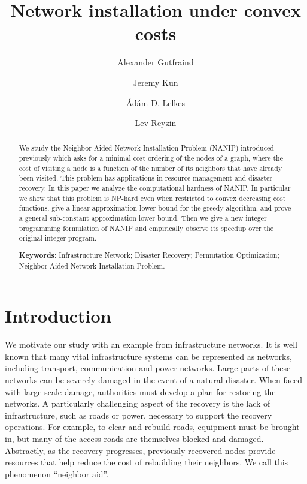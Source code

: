 \documentclass[english]{llncs}
\newcommand{\chg}[1]{\textbf{\color{red} #1}}
\begin{document}
\title{\chg{Network installation under convex costs}}
\date{}

\author{Alexander Gutfraind \and
Jeremy Kun \and
\'Ad\'am D. Lelkes \and
Lev Reyzin}  


\maketitle
 
 
\begin{abstract}
We study the Neighbor Aided Network Installation Problem (NANIP) introduced
previously which asks for a minimal cost ordering of the nodes of
a graph, where the cost of visiting a node is a function of the number of
its neighbors that have already been visited. This problem has applications in
resource management and disaster recovery. In this paper we analyze the
computational hardness of NANIP. In particular we show that this problem is
NP-hard even when restricted to convex decreasing cost functions, give a
linear approximation lower bound for the greedy algorithm, and prove a  
general sub-constant approximation lower bound. Then we give a new
integer programming formulation of NANIP and empirically observe its speedup
over the original integer program.

\noindent
\textbf{Keywords}: Infrastructure Network; Disaster Recovery; Permutation
Optimization; Neighbor Aided Network Installation Problem.  
\end{abstract}

\section{Introduction}
\setcounter{footnote}{3} 

We motivate our study with an example from infrastructure networks.  It is
well known that many vital infrastructure systems can be represented as
networks, including transport, communication and power networks.  Large parts
of these networks can be severely damaged in the event of a natural disaster.
When faced with large-scale damage, authorities must develop a plan for
restoring the networks. A particularly challenging aspect of the recovery is
the lack of infrastructure, such as roads or power, necessary to support the
recovery operations.  For example, to clear and rebuild roads, equipment must
be brought in, but many of the access roads are themselves blocked and damaged.
Abstractly, as the recovery progresses, previously recovered nodes provide
resources that help reduce the cost of rebuilding their neighbors. We call this
phenomenon ``neighbor aid''.
\end{document}
